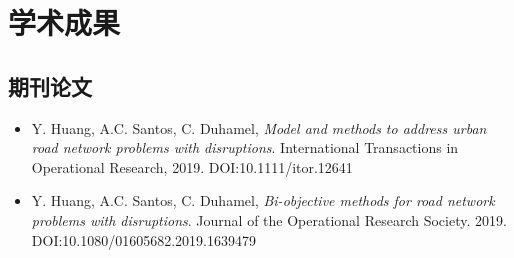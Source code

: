 \documentclass[letterpaper]{twentysecondcv} %
\begin{document}
\vspace{-0.2cm}
\section{学术成果}

\vspace{-0.2cm}
\subsection{期刊论文}
\begin{itemize}
    \item Y. Huang, A.C. Santos, C. Duhamel, \textit{Model and methods to address urban road network problems with disruptions}. International Transactions in Operational Research, 2019. DOI:10.1111/itor.12641
    \item Y. Huang, A.C. Santos, C. Duhamel, \textit{Bi-objective methods for road network problems with disruptions}. Journal of the Operational Research Society. 2019. DOI:10.1080/01605682.2019.1639479
\end{itemize}

\vspace{-0.1cm}
\end{document}
